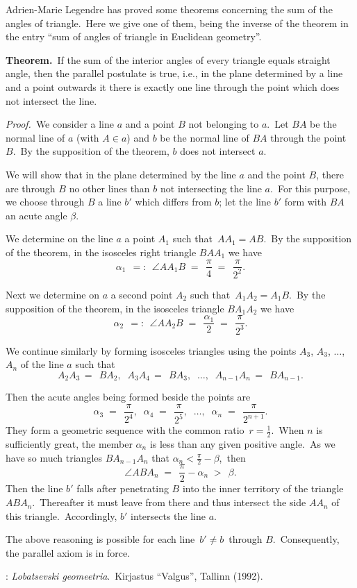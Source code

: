 \documentclass[12pt]{article}
\begin{document}
Adrien-Marie Legendre has proved some theorems concerning the sum of the angles of triangle.\, Here we give one of them, being the inverse of the theorem in the entry ``sum of angles of triangle in Euclidean geometry''.


\textbf{Theorem.}\, If the sum of the interior angles of every triangle equals straight angle, then the parallel postulate is true, i.e., in the plane determined by a line and a point outwards it there is exactly one line through the point which does not intersect the line.

{\it Proof.}\, We consider a line $a$ and a point $B$ not belonging to $a$.\, Let $BA$ be the normal line of $a$
(with $A \in a$) and $b$ be the normal line of $BA$ through the point $B$.\, By the supposition of the theorem, $b$ does not intersect $a$.

We will show that in the plane determined by the line $a$ and the point $B$, there are through $B$ no other lines than $b$ not intersecting the line $a$.\, For this purpose, we choose through $B$ a line $b'$ which differs from $b$; let the line $b'$ form with $BA$ an acute angle $\beta$.

We determine on the line $a$ a point $A_1$ such that\, $AA_1 = AB$.\, By the supposition of the theorem, in the isosceles right triangle $BAA_1$ we have
$$\alpha_1 \;\,=:\;\, \angle AA_1B \;=\;\, \frac{\pi}{4} \;=\;\, \frac{\pi}{2^2}.$$

Next we determine on $a$ a second point $A_2$ such that\, 
$A_1A_2 = A_1B$.\, By the supposition of the theorem, in the isosceles triangle $BA_1A_2$ we have
$$\alpha_2 \;\,=:\;\, \angle AA_2B \;=\;\, \frac{\alpha_1}{2} \;=\;\, \frac{\pi}{2^3}.$$

We continue similarly by forming isosceles triangles using the points $A_3$, $A_3$, $\ldots$, $A_n$ of the line $a$ such that
$$A_2A_3 \,=\;\, BA_2,\;\; A_3A_4 \,=\;\, BA_3,\;\;\ldots,\;\; 
A_{n-1}A_n \,=\;\, BA_{n-1}.$$

Then the acute angles being formed beside the points are
$$\alpha_3 \;=\;\, \frac{\pi}{2^4},\;\; 
\alpha_4 \;=\;\, \frac{\pi}{2^5},\;\; \ldots, \;\;
\alpha_n \;=\;\, \frac{\pi}{2^{n+1}}.$$
They form a geometric sequence with the common ratio\, 
$r = \frac{1}{2}$.\, When $n$ is sufficiently great, the member $\alpha_n$ is less than any given positive angle.\, As we have so much triangles $BA_{n-1}A_n$ that\; 
$\alpha_n < \frac{\pi}{2}\!-\!\beta$,\, then
$$\angle ABA_n \;=\;\, 
\frac{\pi}{2}\!-\!\alpha_n \;>\;\, \beta.$$
Then the line $b'$ falls after penetrating $B$ into the inner territory of the triangle $ABA_n$.\, Thereafter it must leave from there and thus intersect the side $AA_n$ of this triangle.\, Accordingly, $b'$ intersects the line $a$.\, 

The above reasoning is possible for each line\, $b' \neq b$\, through $B$.\, Consequently, the parallel axiom is in force.

\begin{thebibliography}{8}
: {\it Lobatsevski geomeetria}.\, Kirjastus ``Valgus'', Tallinn (1992).
\end{thebibliography} 
\end{document}
